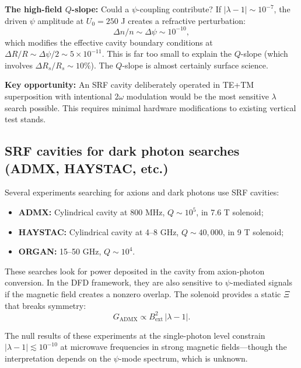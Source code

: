 \documentclass[12pt,letterpaper]{article}
\begin{document}
\textbf{The high-field $Q$-slope:} Could a $\psi$-coupling contribute?
If $|\lambda - 1| \sim 10^{-7}$, the driven $\psi$ amplitude at
$U_0 = 250$ J creates a refractive perturbation:
\begin{equation}
  \Delta n/n \sim \Delta\psi \sim 10^{-10},
\end{equation}
which modifies the effective cavity boundary conditions at
$\Delta R/R \sim \Delta\psi/2 \sim 5\times 10^{-11}$.  This is
far too small to explain the $Q$-slope (which involves $\Delta R_s/R_s
\sim 10\%$).  The $Q$-slope is almost certainly surface science.

\textbf{Key opportunity:} An SRF cavity deliberately operated in TE+TM
superposition with intentional $2\omega$ modulation would be the most
sensitive $\lambda$ search possible.  This requires minimal hardware
modifications to existing vertical test stands.

\subsection{SRF cavities for dark photon searches (ADMX, HAYSTAC, etc.)}

Several experiments searching for axions and dark photons use SRF
cavities:
\begin{itemize}[noitemsep]
  \item \textbf{ADMX:} Cylindrical cavity at 800 MHz, $Q \sim 10^5$,
    in 7.6 T solenoid;
  \item \textbf{HAYSTAC:} Cylindrical cavity at 4--8 GHz,
    $Q \sim 40{,}000$, in 9 T solenoid;
  \item \textbf{ORGAN:} 15--50 GHz, $Q \sim 10^4$.
\end{itemize}

These searches look for power deposited in the cavity from axion-photon
conversion.  In the DFD framework, they are also sensitive to
$\psi$-mediated signals if the magnetic field creates a nonzero
overlap.  The solenoid provides a static $\Xi$ that breaks symmetry:
\begin{equation}
  G_{\text{ADMX}} \propto B_{\text{ext}}^2\,|\lambda - 1|.
\end{equation}

The null results of these experiments at the single-photon level
constrain $|\lambda - 1| \lesssim 10^{-10}$ at microwave frequencies
in strong magnetic fields---though the interpretation depends on the
$\psi$-mode spectrum, which is unknown.

\end{document}
